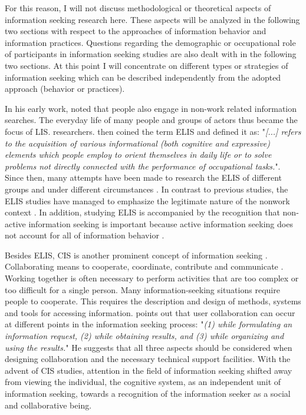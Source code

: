 \documentclass[12pt, a4paper, titlepage, oneside, abstract=true, toc=listof, toc=bibliography, BCOR=1cm]{scrreprt}
\begin{document}
For this reason, I will not discuss methodological or theoretical aspects of information seeking research here. These aspects will be analyzed in the following two sections with respect to the approaches of information behavior and information practices. Questions regarding the demographic or occupational role of participants in information seeking studies are also dealt with in the following two sections. At this point I will concentrate on different types or strategies of information seeking which can be described independently from the adopted approach (behavior or practices). 

In his early work, \citet{Wilson1977} noted that people also engage in non-work related information searches. The everyday life of many people and groups of actors thus became the focus of \gls{LIS}. researchers.   \citet{Savolainen1995} then coined the term \gls{ELIS} and defined it as: "\textit{[...] refers to the acquisition of various informational (both cognitive and expressive) elements which people employ to orient themselves in daily life or to solve problems not directly connected with the performance of occupational tasks.}". Since then, many attempts have been made to research the ELIS of different groups and under different circumstances \citep[e.g.][]{Agosto2005, Fisher2006a, Loudon2016, Kim2016, McKenzie2003a}. In contrast to previous studies, the ELIS studies have managed to emphasize the legitimate nature of the nonwork context \citep[p. 266]{Savolainen1995}. In addition, studying ELIS is accompanied by the recognition that non-active information seeking is important because active information seeking does not account for all of information behavior \citep[p. 21]{McKenzie2003a}. 

Besides ELIS, \gls{CIS} is another prominent concept of information seeking \citep[e.g.][]{Boehm2014, Hansen2016, Hertzum2008, Hertzum2019, Shah2010, Shah2013}. Collaborating means to cooperate, coordinate, contribute and communicate \citep[p. 6]{Shah2010}. Working together is often necessary to perform activities that are too complex or too difficult for a single person. Many information-seeking situations require people to cooperate. This requires the description and design of methods, systems and tools for accessing information. \citet[p. 26]{Shah2010} points out that user collaboration can occur at different points in the information seeking process: "\textit{(1) while formulating an information request, (2) while obtaining results, and (3) while organizing and using the results.}" He suggests that all three aspects should be considered when designing collaboration and the necessary technical support facilities. With the advent of CIS studies, attention in the field of information seeking shifted away from viewing the individual, the cognitive system, as an independent unit of information seeking, towards a recognition of the information seeker as a social and collaborative being.
\end{document}
